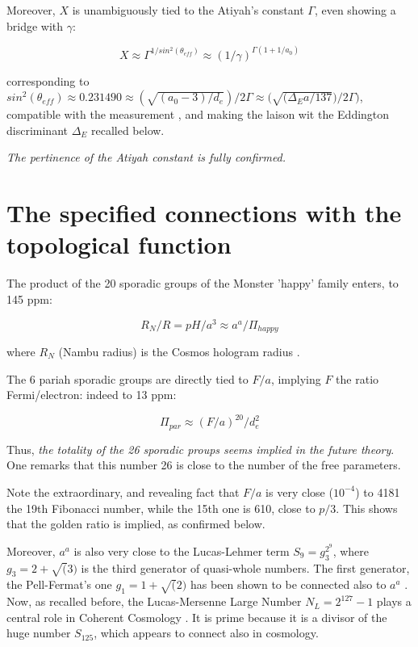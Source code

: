 \documentclass[a4paper,9pt]{article}
\begin{document}
Moreover, $X$ is unambiguously tied to the Atiyah's constant $\Gamma$, even showing a bridge with $\gamma$:

\begin{equation}
X \approx \Gamma ^{1/sin^2(\theta_{eff})} \approx (1/\gamma)^{\Gamma (1+1/a_0)}
\end{equation}  

corresponding to $ sin^2(\theta_{eff})\approx 0.231490 \approx (\sqrt{(a_0 -3)/d_e})/2\Gamma \approx \bigg(\sqrt{(\Delta_E a/137})/2\Gamma\bigg)$, compatible with the measurement \cite{Tanabashi}, and making the laison wit the Eddington discriminant $\Delta_E$ recalled below. 


\textit{The pertinence of the Atiyah constant is fully confirmed.}

   
   
 \section{The specified connections with the topological function}

The product of the 20 sporadic groups of the Monster 'happy' family enters, to 145 ppm:

\begin{equation}
 R_N/R = pH/a^3 \approx a^a /\Pi_{happy}
\end{equation}

where $R_N$ (Nambu radius) is the Cosmos hologram radius \cite {Sanchez}. 

The 6 pariah sporadic groups are directly tied to $F/a$, implying $F$ the ratio Fermi/electron: indeed to 13 ppm:

\begin{equation}
\Pi_{par} \approx (F/a)^{20}/d_e^2
\end{equation}

Thus, \textit{the totality of the 26 sporadic proups seems implied in the future theory}. One remarks that this number 26 is close to the number of the free parameters.


Note the extraordinary, and revealing fact that $F/a$ is very close ($10^{-4}$) to 4181 the 19th Fibonacci number, while the 15th one is 610, close to $p/3$. This shows that the golden ratio is implied, as confirmed below.
 

Moreover, $a^a$  is also very close to the Lucas-Lehmer term $S_9 = g_3^{2^9}$, where $ g_3 = 2 + \sqrt(3)$ is the third generator of quasi-whole numbers. The first generator, the Pell-Fermat's one $g_1 = 1 + \sqrt(2)$ has been shown to be connected also to $a^a$ \cite{Sanchez}. Now, as recalled before, the Lucas-Mersenne Large Number $N_L = 2^{127} - 1$ plays a central role in Coherent Cosmology \cite{Sanchez}. It is prime because it is a divisor of the huge number $S_{125}$, which appears to connect also in cosmology.
\end{document}
